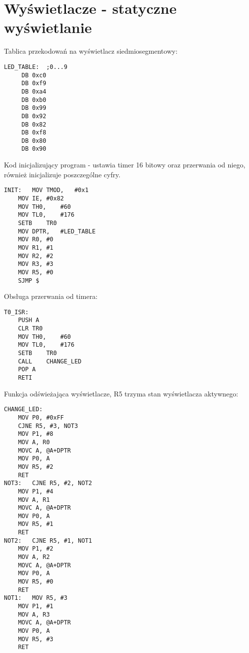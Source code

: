 \documentclass[a4paper, 12pt, titlepage]{article}
\begin{document}
	\section{Wyświetlacze - statyczne wyświetlanie}
	Tablica przekodowań na wyświetlacz siedmiosegmentowy:
\begin{lstlisting}
LED_TABLE:	;0...9
     DB 0xc0 
     DB 0xf9
     DB 0xa4
     DB 0xb0
     DB 0x99
     DB 0x92      
     DB 0x82
     DB 0xf8      
     DB 0x80      
     DB 0x90
\end{lstlisting}
	Kod inicjalizujący program - ustawia timer 16 bitowy oraz przerwania od niego, również inicjalizuje poszczególne cyfry.
\begin{lstlisting}
INIT:	MOV	TMOD,	#0x1
	MOV	IE,	#0x82
	MOV	TH0,	#60
	MOV	TL0,	#176
	SETB	TR0
	MOV	DPTR,	#LED_TABLE
	MOV	R0,	#0
	MOV	R1,	#1
	MOV	R2,	#2
	MOV	R3,	#3
	MOV R5, #0
	SJMP $
\end{lstlisting}
	Obsługa przerwania od timera:
\begin{lstlisting}
T0_ISR:    
	PUSH A
	CLR	TR0
	MOV	TH0,    #60
	MOV	TL0,    #176
	SETB	TR0
	CALL	CHANGE_LED
	POP A
	RETI
\end{lstlisting}
\newpage\noindent
Funkcja odświeżająca wyświetlacze, R5 trzyma stan wyświetlacza aktywnego:
\begin{lstlisting}
CHANGE_LED:
	MOV P0, #0xFF 
	CJNE R5, #3, NOT3
	MOV P1, #8
	MOV A, R0
	MOVC A, @A+DPTR
	MOV	P0, A
	MOV R5, #2
	RET
NOT3:	CJNE R5, #2, NOT2
	MOV P1, #4
	MOV A, R1
	MOVC A, @A+DPTR
	MOV	P0, A
	MOV R5, #1
	RET
NOT2:	CJNE R5, #1, NOT1
	MOV P1, #2
	MOV A, R2
	MOVC A, @A+DPTR
	MOV	P0, A
	MOV R5, #0
	RET
NOT1:	MOV R5, #3
	MOV P1, #1
	MOV A, R3
	MOVC A, @A+DPTR
	MOV	P0, A
	MOV R5, #3
	RET
\end{lstlisting}
\newpage\noindent
\end{document}
